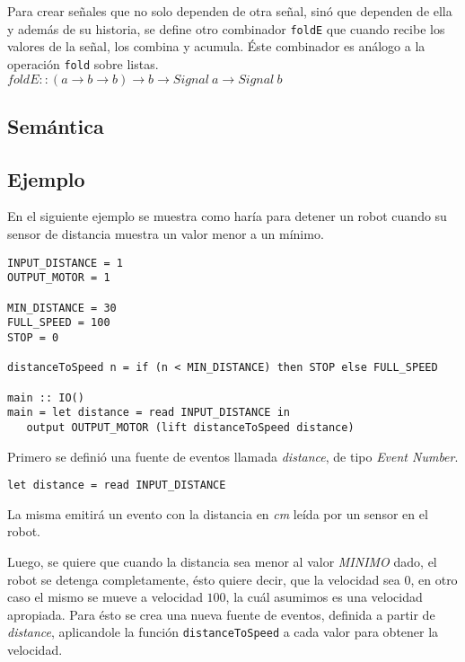 Para crear señales que no solo dependen de otra señal, sinó que dependen
de ella y además de su historia, se define otro combinador \texttt{foldE}
que cuando recibe los valores de la señal, los combina y acumula. Éste
combinador es análogo a la operación \texttt{fold} sobre listas.\\

$foldE :: (a \rightarrow b \rightarrow b) \rightarrow b \rightarrow Signal\ a \rightarrow Signal\ b$\\

\subsection{Semántica}


\subsection{Ejemplo}

En el siguiente ejemplo se muestra como haría para detener un
robot cuando su sensor de distancia muestra un valor menor a un mínimo.

\begin{verbatim}
INPUT_DISTANCE = 1
OUTPUT_MOTOR = 1

MIN_DISTANCE = 30
FULL_SPEED = 100
STOP = 0

distanceToSpeed n = if (n < MIN_DISTANCE) then STOP else FULL_SPEED

main :: IO()
main = let distance = read INPUT_DISTANCE in
   output OUTPUT_MOTOR (lift distanceToSpeed distance)

\end{verbatim}

Primero se definió una fuente de eventos llamada \emph{distance},
de tipo \emph{Event Number}.

\begin{verbatim}
let distance = read INPUT_DISTANCE
\end{verbatim}

La misma emitirá un evento con la distancia en \emph{cm} leída
por un sensor en el robot.

  Luego, se quiere que cuando la distancia sea menor al valor
\emph{MINIMO} dado, el robot se detenga completamente, ésto
quiere decir, que la velocidad sea $0$, en otro caso el mismo
se mueve a velocidad $100$, la cuál asumimos es una velocidad
apropiada.
  Para ésto se crea una nueva fuente de eventos, definida a partir
de \emph{distance}, aplicandole la función \texttt{distanceToSpeed} 
a cada valor para obtener la velocidad.

